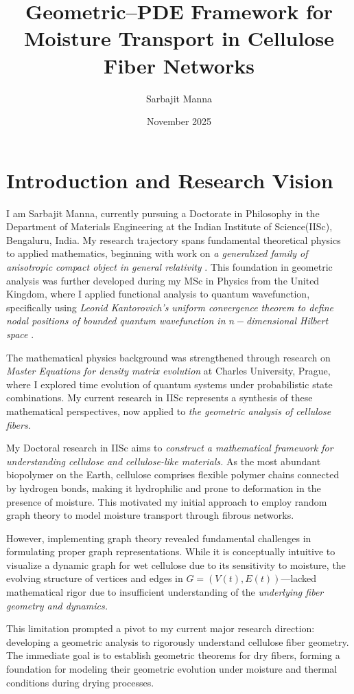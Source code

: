 \documentclass[11pt]{article}
\title{\textbf{Geometric--PDE Framework for Moisture Transport in Cellulose Fiber Networks}}
\author{Sarbajit Manna}
\date{November 2025}
\begin{document}
\maketitle

\section{Introduction and Research Vision}
I am Sarbajit Manna, currently pursuing a Doctorate in Philosophy in the Department of Materials Engineering at the Indian Institute of Science(IISc), Bengaluru, India. My research trajectory spans fundamental theoretical physics to applied mathematics, beginning with work on \textit{a generalized family of anisotropic compact object in general relativity} \cite{maurya2018generalized}. This foundation in geometric analysis was further developed during my MSc in Physics from the United Kingdom, where I applied functional analysis to quantum wavefunction, specifically using \textit{ Leonid Kantorovich's uniform convergence theorem to define nodal positions of bounded quantum wavefunction in $n-$dimensional Hilbert space} \cite{ArnauMScUK}.

The mathematical physics background was strengthened through research on \textit{Master Equations for density matrix evolution} at Charles University, Prague, where I explored time evolution of quantum systems under probabilistic state combinations. My current research in IISc represents a synthesis of these mathematical perspectives, now applied to \textit{the geometric analysis of cellulose fibers.}

My Doctoral research in IISc aims to \textit{construct a mathematical framework for understanding cellulose and cellulose-like materials.} As the most abundant biopolymer on the Earth, cellulose comprises flexible polymer chains connected by hydrogen bonds, making it hydrophilic and prone to deformation in the presence of moisture. This motivated my initial approach to employ random graph theory to model moisture transport through fibrous networks.

However, implementing graph theory revealed fundamental challenges in formulating proper graph representations. While it is conceptually intuitive to visualize a dynamic graph for wet cellulose due to its sensitivity to moisture, the evolving structure of vertices and edges in $G=(V(t), E(t))$---lacked mathematical rigor due to insufficient understanding of the \textit{underlying fiber geometry and dynamics.} 

This limitation prompted a pivot to my current major research direction: developing a geometric analysis to rigorously understand cellulose fiber geometry. The immediate goal is to establish geometric theorems for dry fibers, forming a foundation for modeling their geometric evolution under moisture and thermal conditions during drying processes.
\end{document}
